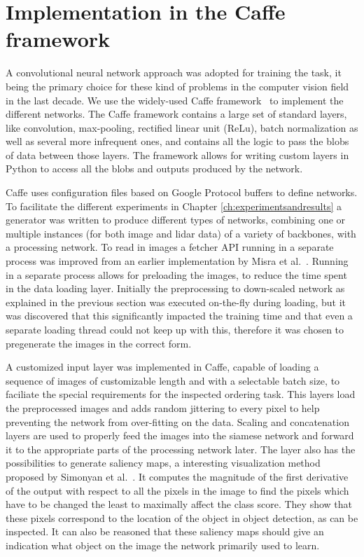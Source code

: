 \section{Implementation in the Caffe framework}
A convolutional neural network approach was adopted for training the task, it being the primary choice for these kind of problems in the computer vision field in the last decade. We use the widely-used Caffe framework~\cite{jia2014} to implement the different networks. The Caffe framework contains a large set of standard layers, like convolution, max-pooling, rectified linear unit (ReLu), batch normalization as well as several more infrequent ones, and contains all the logic to pass the blobs of data between those layers. The framework allows for writing custom layers in Python to access all the blobs and outputs produced by the network.

Caffe uses configuration files based on Google Protocol buffers to define networks. To facilitate the different experiments in Chapter \ref{ch:experimentsandresults} a generator was written to produce different types of networks, combining one or multiple instances (for both image and lidar data) of a variety of backbones, with a processing network. To read in images a fetcher API running in a separate process was improved from an earlier implementation by Misra et al.~\cite{misra2016}. Running in a separate process allows for preloading the images, to reduce the time spent in the data loading layer. Initially the preprocessing to down-scaled network as explained in the previous section was executed on-the-fly during loading, but it was discovered that this significantly impacted the training time and that even a separate loading thread could not keep up with this, therefore it was chosen to pregenerate the images in the correct form.

A customized input layer was implemented in Caffe, capable of loading a sequence of images of customizable length and with a selectable batch size, to faciliate the special requirements for the inspected ordering task. This layers load the preprocessed images and adds random jittering to every pixel to help preventing the network from over-fitting on the data. Scaling and concatenation layers are used to properly feed the images into the siamese network and forward it to the appropriate parts of the processing network later. The layer also has the possibilities to generate saliency maps, a interesting visualization method proposed by Simonyan et al.~\cite{simonyan2013}. It computes the magnitude of the first derivative of the output with respect to all the pixels in the image to find the pixels which have to be changed the least to maximally affect the class score. They show that these pixels correspond to the location of the object in object detection, as can be inspected. It can also be reasoned that these saliency maps should give an indication what object on the image the network primarily used to learn.

